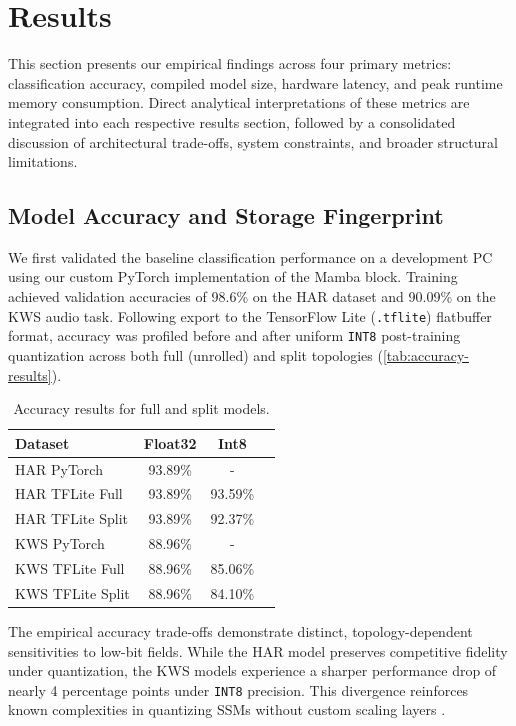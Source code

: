 \section{Results}
\label{sec:results}

This section presents our empirical findings across four primary metrics: classification accuracy, compiled model size, hardware latency, and peak runtime memory consumption. Direct analytical interpretations of these metrics are integrated into each respective results section, followed by a consolidated discussion of architectural trade-offs, system constraints, and broader structural limitations.

\subsection{Model Accuracy and Storage Fingerprint}

We first validated the baseline classification performance on a development PC using our custom PyTorch implementation of the Mamba block. Training achieved validation accuracies of 98.6\% on the HAR dataset and 90.09\% on the KWS audio task. Following export to the TensorFlow Lite (\texttt{.tflite}) flatbuffer format, accuracy was profiled before and after uniform \texttt{INT8} post-training quantization across both full (unrolled) and split topologies (\autoref{tab:accuracy-results}).

\begin{table}[ht]
  \centering
  \caption{Accuracy results for full and split models.}
  \label{tab:accuracy-results}
  \begin{tabular}{lccc}
    Dataset & Float32 & Int8 \\
    \midrule
    HAR PyTorch & 93.89\% & - \\
    HAR TFLite Full & 93.89\% & 93.59\% \\
    HAR TFLite Split & 93.89\% & 92.37\% \\
    \midrule
    KWS PyTorch & 88.96\% & - \\
    KWS TFLite Full & 88.96\% & 85.06\% \\
    KWS TFLite Split & 88.96\% & 84.10\% \\
    \bottomrule
  \end{tabular}
\end{table}

The empirical accuracy trade-offs demonstrate distinct, topology-dependent sensitivities to low-bit fields. While the HAR model preserves competitive fidelity under quantization, the KWS models experience a sharper performance drop of nearly 4 percentage points under \texttt{INT8} precision. This divergence reinforces known complexities in quantizing SSMs without custom scaling layers \cite{xuMambaQuantQuantizingMamba2025}.


